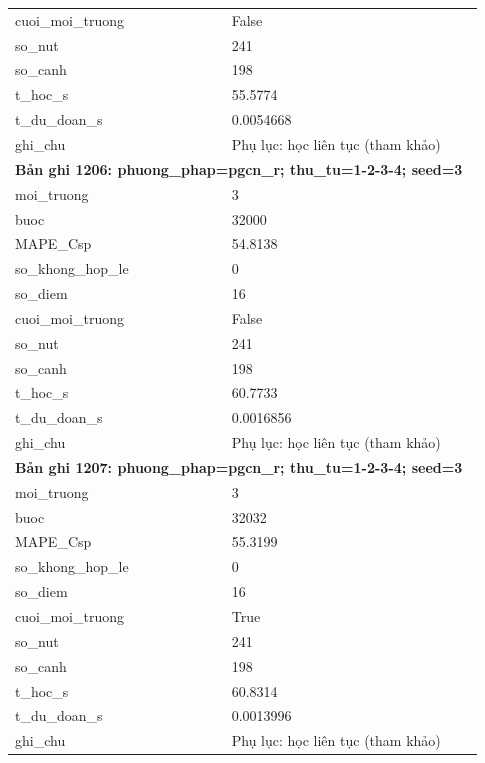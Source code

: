 \begin{longtable}{p{0.43\linewidth}p{0.50\linewidth}}
cuoi\_\allowbreak moi\_\allowbreak truong & False \\
so\_\allowbreak nut & 241 \\
so\_\allowbreak canh & 198 \\
t\_\allowbreak hoc\_\allowbreak s & 55.5774 \\
t\_\allowbreak du\_\allowbreak doan\_\allowbreak s & 0.0054668 \\
ghi\_\allowbreak chu & Phụ lục: học liên tục (tham khảo) \\
\midrule
\multicolumn{2}{p{0.95\linewidth}}{\textbf{Bản ghi 1206: phuong\_phap=pgcn\_r; thu\_tu=1-2-3-4; seed=3}} \\
moi\_\allowbreak truong & 3 \\
buoc & 32000 \\
MAPE\_\allowbreak Csp & 54.8138 \\
so\_\allowbreak khong\_\allowbreak hop\_\allowbreak le & 0 \\
so\_\allowbreak diem & 16 \\
cuoi\_\allowbreak moi\_\allowbreak truong & False \\
so\_\allowbreak nut & 241 \\
so\_\allowbreak canh & 198 \\
t\_\allowbreak hoc\_\allowbreak s & 60.7733 \\
t\_\allowbreak du\_\allowbreak doan\_\allowbreak s & 0.0016856 \\
ghi\_\allowbreak chu & Phụ lục: học liên tục (tham khảo) \\
\midrule
\multicolumn{2}{p{0.95\linewidth}}{\textbf{Bản ghi 1207: phuong\_phap=pgcn\_r; thu\_tu=1-2-3-4; seed=3}} \\
moi\_\allowbreak truong & 3 \\
buoc & 32032 \\
MAPE\_\allowbreak Csp & 55.3199 \\
so\_\allowbreak khong\_\allowbreak hop\_\allowbreak le & 0 \\
so\_\allowbreak diem & 16 \\
cuoi\_\allowbreak moi\_\allowbreak truong & True \\
so\_\allowbreak nut & 241 \\
so\_\allowbreak canh & 198 \\
t\_\allowbreak hoc\_\allowbreak s & 60.8314 \\
t\_\allowbreak du\_\allowbreak doan\_\allowbreak s & 0.0013996 \\
ghi\_\allowbreak chu & Phụ lục: học liên tục (tham khảo) \\

\end{longtable}
